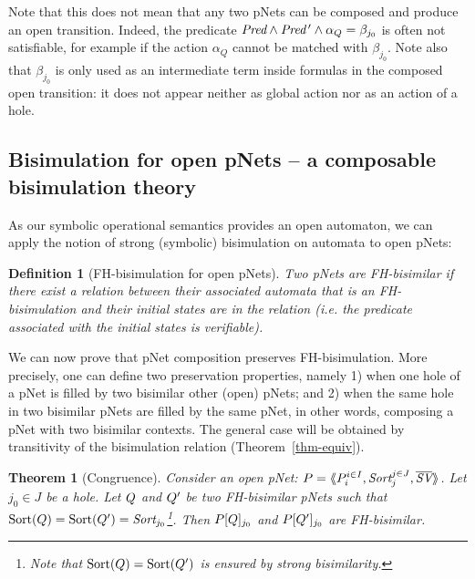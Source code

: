 \documentclass{lmcs}
\newcommand{\TODO}[1]{\textcolor{red}{\textbf{[TODO:#1]}}}
\newtheorem{theorem}{Theorem}
\newtheorem{definition}{Definition}
\begin{document}
Note that this does not mean that any two pNets can be composed and produce an open 
transition. Indeed, the predicate $\Pred\land\Pred\,'\land \alpha_Q=\beta_{j_0}$ is often not  satisfiable, for example if the action  $\alpha_Q$ cannot be matched with $\beta_{j_0}$.
Note also that $\beta_{j_0}$ is  only used as an intermediate term inside formulas in the composed open transition: it 
does not appear neither as global action nor as an action of a hole.


\subsection{Bisimulation for open pNets -- a composable bisimulation theory}
\label{section:bisimulation-PN}
As  our symbolic operational semantics provides an open automaton, we can apply the notion of
	strong (symbolic) bisimulation on automata to open pNets:
\begin{definition}[FH-bisimulation for open pNets]\label{def:bisim-pnets}
Two pNets are FH-bisimilar if there exist a relation between their associated 
automata that is an FH-bisimulation and their initial states are in the relation (i.e. the predicate associated with the initial states is verifiable).
\end{definition}

We can now prove that pNet composition  preserves
FH-bisimulation. More precisely, one can define two preservation
properties, namely 1) when one hole of a pNet is filled by two bisimilar other (open) pNets; and 2) when the same hole in two bisimilar pNets are
filled by the same pNet, in other words, composing a pNet with two
bisimilar contexts. The general case will be obtained by
transitivity of the bisimulation relation (Theorem~\ref{thm-equiv}). 

\begin{theorem}[Congruence]\label{thm-congr-eq}
	Consider an open pNet:
	$\pNet = \mylangle \pNet_i^{i\in I}, \Sort_j^{j\in J}, 
	\set{\symb{SV}}\myrangle$.
	Let $j_0\in J$ be a hole. Let $Q$ and $Q'$ be two FH-bisimilar pNets such that 
	$\Sortop(\pNetQ)=\Sortop(\pNetQ')=\Sort_{j_0}$\footnote{Note that $\operatorname{Sort}(Q)=\operatorname{Sort}(Q')$ is 
	ensured by 
	strong bisimilarity.}. Then 
	$P[Q]_{j_0}$ and 
	$P[Q']_{j_0}$ are FH-bisimilar.
\end{theorem}
 
\end{document}
